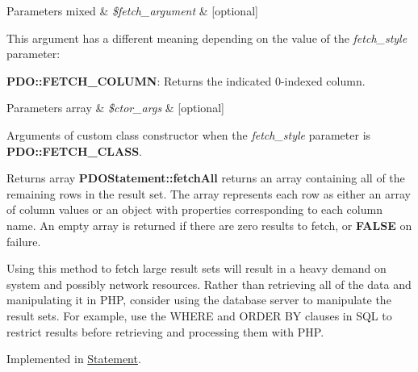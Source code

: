 \begin{DoxyParams}[1]{Parameters}
mixed & {\em \$fetch\+\_\+argument} & \mbox{[}optional\mbox{]} \\
\hline
\end{DoxyParams}
This argument has a different meaning depending on the value of the {\itshape fetch\+\_\+style} parameter\+: 

{\bfseries P\+D\+O\+::\+F\+E\+T\+C\+H\+\_\+\+C\+O\+L\+U\+MN}\+: Returns the indicated 0-\/indexed column. 


\begin{DoxyParams}[1]{Parameters}
array & {\em \$ctor\+\_\+args} & \mbox{[}optional\mbox{]} \\
\hline
\end{DoxyParams}
Arguments of custom class constructor when the {\itshape fetch\+\_\+style} parameter is {\bfseries P\+D\+O\+::\+F\+E\+T\+C\+H\+\_\+\+C\+L\+A\+SS}. 

\begin{DoxyReturn}{Returns}
array {\bfseries P\+D\+O\+Statement\+::fetch\+All} returns an array containing all of the remaining rows in the result set. The array represents each row as either an array of column values or an object with properties corresponding to each column name. An empty array is returned if there are zero results to fetch, or {\bfseries F\+A\+L\+SE} on failure. 
\end{DoxyReturn}


Using this method to fetch large result sets will result in a heavy demand on system and possibly network resources. Rather than retrieving all of the data and manipulating it in P\+HP, consider using the database server to manipulate the result sets. For example, use the W\+H\+E\+RE and O\+R\+D\+ER BY clauses in S\+QL to restrict results before retrieving and processing them with P\+HP. 

Implemented in \mbox{\hyperlink{class_pes_1_1_database_1_1_statement_1_1_statement_ace36703cecd9de1814b68fc8d0e69c73}{Statement}}.

\mbox{\label{interface_pes_1_1_database_1_1_statement_1_1_p_d_o_statement_interface_a56c542d09661688876cab075bedb619d}} 
